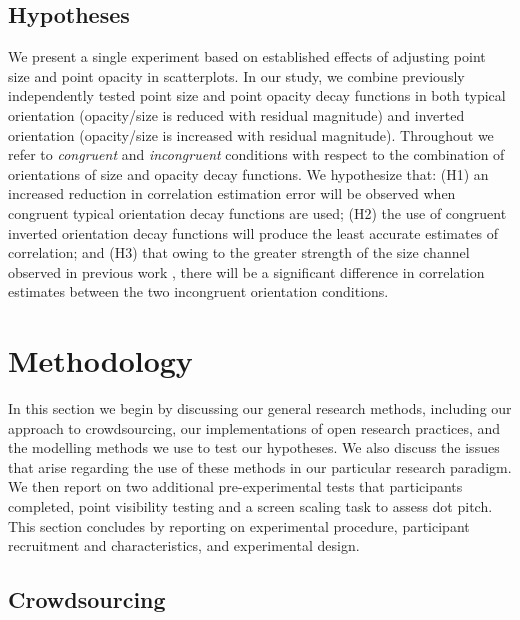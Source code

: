 \documentclass[sigconf]{acmart}
\begin{document}
\hypertarget{hypotheses}{%
\subsection{Hypotheses}\label{hypotheses}}

We present a single experiment based on established effects of adjusting
point size and point opacity in scatterplots. In our study, we combine
previously independently tested point size and point opacity decay
functions in both typical orientation (opacity/size is reduced with
residual magnitude) and inverted orientation (opacity/size is increased
with residual magnitude). Throughout we refer to \emph{congruent} and
\emph{incongruent} conditions with respect to the combination of
orientations of size and opacity decay functions. We hypothesize that:
(H1) an increased reduction in correlation estimation error will be
observed when congruent typical orientation decay functions are used;
(H2) the use of congruent inverted orientation decay functions will
produce the least accurate estimates of correlation; and (H3) that owing
to the greater strength of the size channel observed in previous work
\citep{strain_2023b}, there will be a significant difference in
correlation estimates between the two incongruent orientation
conditions.

\hypertarget{sec-methods}{%
\section{Methodology}\label{sec-methods}}

In this section we begin by discussing our general research methods,
including our approach to crowdsourcing, our implementations of open
research practices, and the modelling methods we use to test our
hypotheses. We also discuss the issues that arise regarding the use of
these methods in our particular research paradigm. We then report on two
additional pre-experimental tests that participants completed, point
visibility testing and a screen scaling task to assess dot pitch. This
section concludes by reporting on experimental procedure, participant
recruitment and characteristics, and experimental design.

\hypertarget{sec-crowdsourcing}{%
\subsection{Crowdsourcing}\label{sec-crowdsourcing}}
\end{document}
